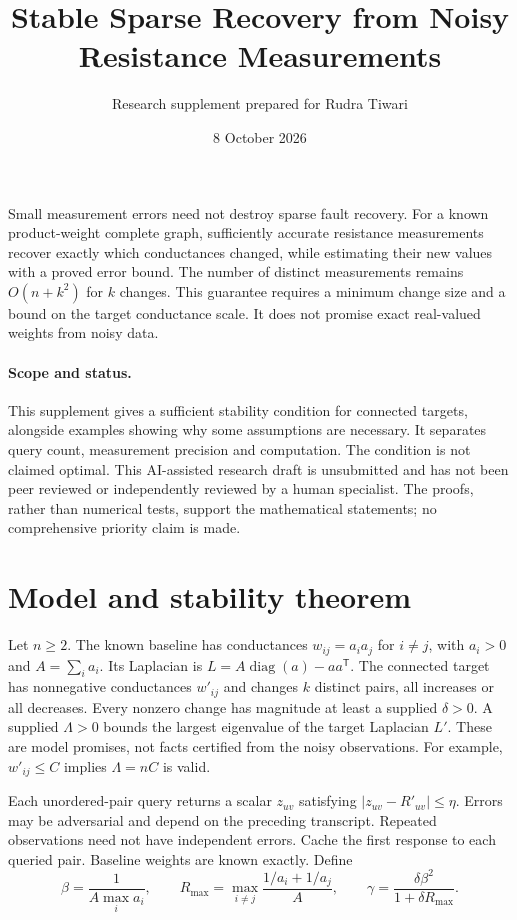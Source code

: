 \documentclass[11pt,letterpaper]{article}
\title{Stable Sparse Recovery from Noisy Resistance Measurements}
\author{Research supplement prepared for Rudra Tiwari}
\date{8 October 2026}
\begin{document}
\maketitle

Small measurement errors need not destroy sparse fault recovery. For a known product-weight complete graph, sufficiently accurate resistance measurements recover exactly which conductances changed, while estimating their new values with a proved error bound. The number of distinct measurements remains $O(n+k^2)$ for $k$ changes. This guarantee requires a minimum change size and a bound on the target conductance scale. It does not promise exact real-valued weights from noisy data.

\paragraph{Scope and status.} This supplement gives a sufficient stability condition for connected targets, alongside examples showing why some assumptions are necessary. It separates query count, measurement precision and computation. The condition is not claimed optimal. This AI-assisted research draft is unsubmitted and has not been peer reviewed or independently reviewed by a human specialist. The proofs, rather than numerical tests, support the mathematical statements; no comprehensive priority claim is made.

\section{Model and stability theorem}
Let $n\ge2$. The known baseline has conductances $w_{ij}=a_i a_j$ for $i\ne j$, with $a_i>0$ and $A=\sum_i a_i$. Its Laplacian is $L=A\operatorname{diag}(a)-aa^{\mathsf T}$. The connected target has nonnegative conductances $w'_{ij}$ and changes $k$ distinct pairs, all increases or all decreases. Every nonzero change has magnitude at least a supplied $\delta>0$. A supplied $\Lambda>0$ bounds the largest eigenvalue of the target Laplacian $L'$. These are model promises, not facts certified from the noisy observations. For example, $w'_{ij}\le C$ implies $\Lambda=nC$ is valid.

Each unordered-pair query returns a scalar $z_{uv}$ satisfying $|z_{uv}-R'_{uv}|\le\eta$. Errors may be adversarial and depend on the preceding transcript. Repeated observations need not have independent errors. Cache the first response to each queried pair. Baseline weights are known exactly. Define
\[
 \beta=\frac{1}{A\max_i a_i},\qquad
 R_{\max}=\max_{i\ne j}\frac{1/a_i+1/a_j}{A},\qquad
 \gamma=\frac{\delta\beta^2}{1+\delta R_{\max}}.
\]
\end{document}
